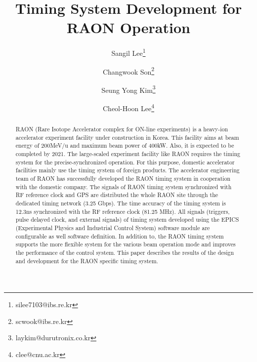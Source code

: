\documentclass[journal]{IEEEtran}
\begin{document}
\title{
	\textbf{Timing System Development for RAON Operation} %
	\vspace{0.5cm}
	\Large
}
\author[1]{Sangil Lee\thanks{silee7103@ibs.re.kr}}
\author[2]{Changwook Son\thanks{scwook@ibs.re.kr}}
\author[3]{Seung Yong Kim\thanks{laykim@durutronix.co.kr}}
\author[4]{Cheol-Hoon Lee\thanks{clee@cnu.ac.kr}}
\date{}
\maketitle
\vspace{2em}

\begin{abstract}
RAON (Rare Isotope Accelerator complex for ON-line experiments) is a heavy-ion accelerator experiment facility under construction in Korea. This facility aims at beam energy of 200MeV/u and maximum beam power of 400kW. Also, it is expected to be completed by 2021. The large-scaled experiment facility like RAON requires the timing system for the precise-synchronized operation. For this purpose, domestic accelerator facilities mainly use the timing system of foreign products. The accelerator engineering team of RAON has successfully developed the RAON timing system in cooperation with the domestic company. The signals of RAON timing system synchronized with RF reference clock and GPS are distributed the whole RAON site through the dedicated timing network (3.25 Gbps). The time accuracy of the timing system is 12.3ns synchronized with the RF reference clock (81.25 MHz). All signals (triggers, pulse delayed clock, and external signals) of timing system developed using the EPICS (Experimental Physics and Industrial Control System) software module are configurable as well software definition. In addition to, the RAON timing system supports the more flexible system for the various beam operation mode and improves the performance of the control system. \newline
This paper describes the results of the design and development for the RAON specific timing system.
\end{abstract}

\end{document}
